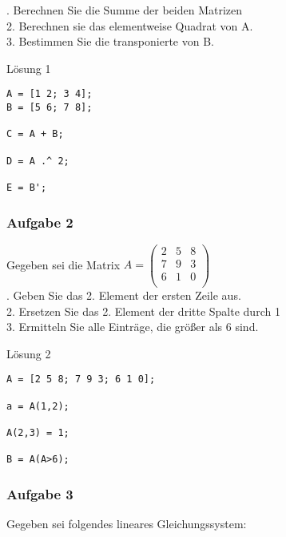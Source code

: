             \vspace{0.5cm}
            . Berechnen Sie die Summe der beiden Matrizen \\
            2. Berechnen sie das elementweise Quadrat von A. \\
            3. Bestimmen Sie die transponierte von B.

            \begin{Codelösung}{Lösung 1}
                \begin{lstlisting}
A = [1 2; 3 4];
B = [5 6; 7 8];

C = A + B;

D = A .^ 2;

E = B';
                \end{lstlisting}
                
            \end{Codelösung}
            \subsubsection*{Aufgabe 2}

            Gegeben sei die Matrix $A = \begin{pmatrix}
                2 & 5 & 8  \\
                7 & 9 & 3  \\
                6 & 1 & 0  \\
            \end{pmatrix}$\\

            \vspace{0.5cm}
            . Geben Sie das 2. Element der ersten Zeile aus.\\
            2. Ersetzen Sie das 2. Element der dritte Spalte durch 1\\
            3. Ermitteln Sie alle Einträge, die größer als 6 sind.

            \begin{Codelösung}{Lösung 2}
                \begin{lstlisting}
A = [2 5 8; 7 9 3; 6 1 0];         

a = A(1,2);

A(2,3) = 1;

B = A(A>6);
                \end{lstlisting}
            \end{Codelösung}
            \subsubsection*{Aufgabe 3}
            Gegeben sei folgendes lineares Gleichungssystem:
            
